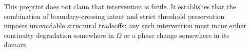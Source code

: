 \begin{remark}
This preprint does not claim that intervention is futile.
It establishes that the combination of boundary-crossing intent and strict
threshold preservation imposes unavoidable structural tradeoffs: any such
intervention must incur either continuity degradation somewhere in $\Omega$ or
a phase change somewhere in its domain.
\end{remark}
